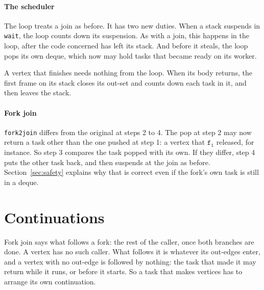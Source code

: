 \documentclass[sigplan,nonacm]{acmart}
\newcommand{\fo}{\mathtt{f_1}}
\begin{document}
\paragraph{The scheduler}
%
The loop treats a join as before.
%
It has two new duties.
%
When a stack suspends in \lstinline|wait|, the loop counts down its
suspension.
%
As with a join, this happens in the loop, after the code concerned has
left its stack.
%
And before it steals, the loop pops its own deque, which now may hold
tasks that became ready on its worker.

A vertex that finishes needs nothing from the loop.
%
When its body returns, the first frame on its stack closes its out-set
and counts down each task in it, and then leaves the stack.

\paragraph{Fork join}
%
\lstinline|fork2join| differs from the original at steps 2 to 4.
%
The pop at step 2 may now return a task other than the one pushed at
step 1: a vertex that $\fo$ released, for instance.
%
So step 3 compares the task popped with its own.
%
If they differ, step 4 puts the other task back, and then suspends at
the join as before.
%
Section~\ref{sec:safety} explains why that is correct even if the
fork's own task is still in a deque.

\section{Continuations}
\label{sec:continuations}

Fork join says what follows a fork: the rest of the caller, once both
branches are done.
%
A vertex has no such caller.
%
What follows it is whatever its out-edges enter, and a vertex with no
out-edge is followed by nothing: the task that made it may return
while it runs, or before it starts.
%
So a task that makes vertices has to arrange its own continuation.
\end{document}
